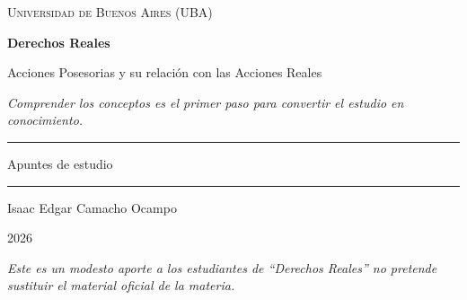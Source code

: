\documentclass[12pt,oneside]{book}
\newcommand{\universidad}{Universidad de Buenos Aires (UBA)}
\newcommand{\materia}{Derechos Reales}
\newcommand{\titulo}{Acciones Posesorias y su relación con las Acciones Reales}
\newcommand{\autor}{Isaac Edgar Camacho Ocampo}
\newcommand{\anio}{2026}
\newcommand{\reflexion}{Comprender los conceptos es el primer paso para convertir el estudio en conocimiento.}
\begin{document}
\begin{titlepage}

\thispagestyle{empty}

\begin{center}

\vspace*{1cm}

{\large \textsc{\universidad}}

\vspace{3cm}

{\Huge \textbf{\materia}}

\vspace{1cm}

{\LARGE \titulo}

\vspace{0.8cm}

\textit{\reflexion}

\vspace{1.2cm}

\rule{0.70\textwidth}{0.5pt}

\vspace{0.5cm}

{\large Apuntes de estudio}

\vspace{0.5cm}

\rule{0.70\textwidth}{0.5pt}

\vfill

{\large \autor}

\vspace{0.3cm}

{\large \anio}

\end{center}

\vfill

\begin{flushleft}
\textit{Este es un modesto aporte a los estudiantes de ``Derechos Reales'' no pretende sustituir el material oficial de la materia.}
\end{flushleft}

\end{titlepage}

\tableofcontents

\end{document}
